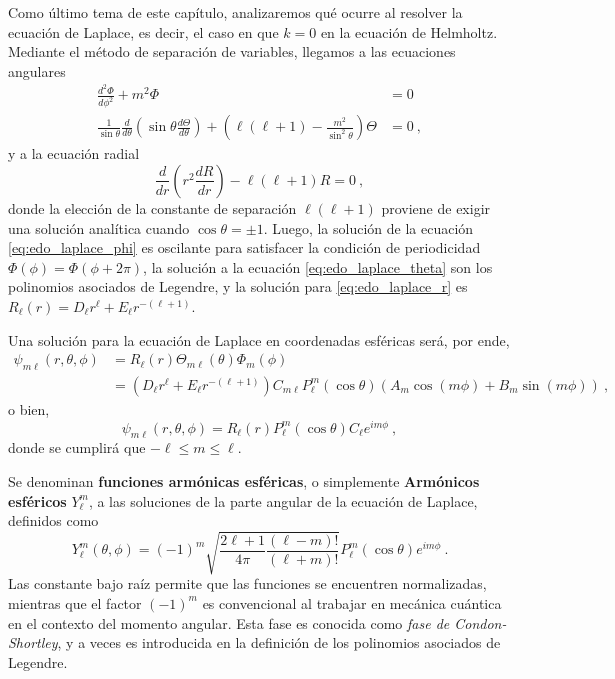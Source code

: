 Como último tema de este capítulo, analizaremos qué ocurre al resolver la ecuación de Laplace, es decir, el caso en que $k=0$ en la ecuación de Helmholtz. Mediante el método de separación de variables, llegamos a las ecuaciones angulares
\begin{align}
    \frac{d^2 \Phi}{d\phi^2} + m^2 \Phi & = 0 \label{eq:edo_laplace_phi} \\
    \frac{1}{\sin \theta} \frac{d}{d\theta}\left( \sin\theta \frac{d\Theta}{d\theta} \right) + \left( \ell(\ell+1) - \frac{m^2}{\sin^2\theta} \right)\Theta & = 0 \label{eq:edo_laplace_theta} \ ,
\end{align}
y a la ecuación radial
\begin{equation}
    \frac{d}{dr}\left( r^2 \frac{dR}{dr} \right) - \ell(\ell+1) R = 0 \ , \label{eq:edo_laplace_r}
\end{equation}
donde la elección de la constante de separación $\ell(\ell+1)$ proviene de exigir una solución analítica cuando $\cos\theta = \pm 1$. Luego, la solución de la ecuación \eqref{eq:edo_laplace_phi} es oscilante para satisfacer la condición de periodicidad $\Phi(\phi) = \Phi(\phi + 2\pi)$, la solución a la ecuación \eqref{eq:edo_laplace_theta} son los polinomios asociados de Legendre, y la solución para \eqref{eq:edo_laplace_r} es $R_\ell(r) = D_\ell r^\ell + E_\ell r^{-(\ell+1)}$.

Una solución para la ecuación de Laplace en coordenadas esféricas será, por ende,
\begin{align}
    \psi_{m\ell}(r,\theta,\phi) & = R_\ell(r) \Theta_{m\ell}(\theta) \Phi_m (\phi) \nonumber \\
    & = (D_\ell r^\ell + E_\ell r^{-(\ell+1)}) C_{m\ell} P_\ell^m(\cos\theta)(A_m \cos(m\phi) + B_m \sin(m\phi)) \ ,
\end{align}
o bien,
\begin{equation}
    \psi_{m\ell}(r,\theta,\phi) = R_\ell(r) P_\ell^m(\cos\theta) C_\ell e^{im\phi} \ ,
\end{equation}
donde se cumplirá que $- \ell \leq m \leq \ell$.

\begin{defi} 
    Se denominan \textbf{funciones armónicas esféricas}, o simplemente \textbf{Armónicos esféricos} $Y_\ell^m$, a las soluciones de la parte angular de la ecuación de Laplace, definidos como
    \begin{equation}
        Y_\ell^m(\theta, \phi) = (-1)^m \sqrt{\frac{2\ell + 1}{4\pi} \frac{(\ell-m)!}{(\ell+m)!} } P_\ell^m (\cos\theta) e^{im\phi} \ .
    \end{equation}
    Las constante bajo raíz permite que las funciones se encuentren normalizadas, mientras que el factor $(-1)^m$ es convencional al trabajar en mecánica cuántica en el contexto del momento angular. Esta fase es conocida como \emph{fase de Condon-Shortley}, y a veces es introducida en la definición de los polinomios asociados de Legendre.
\end{defi}


